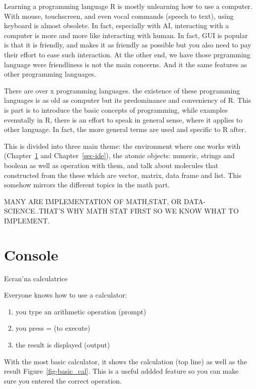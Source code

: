 \documentclass[
  letterpaper,
  DIV=11,
  numbers=noendperiod]{scrreprt}
\providecommand{\tightlist}{%
  \setlength{\itemsep}{0pt}\setlength{\parskip}{0pt}}
\begin{document}
Learning a programming language R is mostly unlearning how to use a
computer. With mouse, touchscreen, and even vocal commands (speech to
text), using keyboard is almost obsolete. In fact, especially with AI,
interacting with a computer is more and more like interacting with
human. In fact, GUI is popular is that it is friendly, and makes it as
friendly as possible but you also need to pay their effort to ease such
interaction. At the other end, we have those prgramming language were
friendliness is not the main concerns. And it the same features as other
programming languages.

There are over x programming languages. the existence of these
programming languages is as old as computer but its predominance and
conveniency of R. This is part is to introduce the basic concepts of
programming, while examples evenutally in R, there is an effort to speak
in general sense, where it applies to other language. In fact, the more
general terms are used and specific to R after.

This is divided into three main theme: the environment where one works
with (Chapter~\ref{sec-console} and Chapter~\ref{sec-ide}), the atomic
objects: numeric, strings and boolean as well as operation with them,
and talk about molecules that constructed from the these which are
vector, matrix, data frame and list. This somehow mirrors the different
topics in the math part.

MANY ARE IMPLEMENTATION OF MATH,STAT, OR DATA-SCIENCE..THAT'S WHY MATH
STAT FIRST SO WE KNOW WHAT TO IMPLEMENT.

\chapter{Console}\label{sec-console}

Ecran'na calculatrice

Everyone knows how to use a calculator:

\begin{enumerate}
\def\labelenumi{\arabic{enumi}.}
\tightlist
\item
  you type an arithmetic operation (prompt)
\item
  you press = (to execute)
\item
  the result is displayed (output)
\end{enumerate}

With the most basic calculator, it shows the calculation (top line) as
well as the result Figure~\ref{fig-basic_cal}. This is a useful addded
feature so you can make sure you entered the correct operation.
\end{document}
